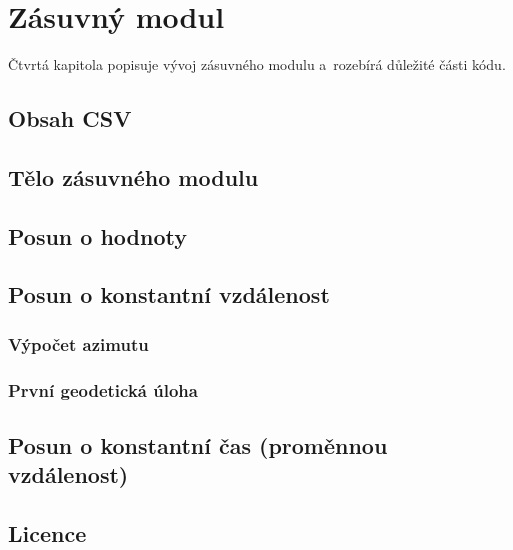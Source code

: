 \chapter{Zásuvný modul}
\label{4-plugin}

Čtvrtá kapitola popisuje vývoj zásuvného modulu a~rozebírá důležité části kódu. 


\section{Obsah CSV}
\label{obsah}

\section{Tělo zásuvného modulu}
\label{telo}

\section{Posun o hodnoty}
\label{by_points}

\section{Posun o konstantní vzdálenost}
\label{by_distance}

\subsection{Výpočet azimutu}
\label{azimut}

\subsection{První geodetická úloha}
\label{prvniguplugin}

\section{Posun o konstantní čas (proměnnou vzdálenost)}
\label{by_seconds}

\section{Licence}
\label{licence}



